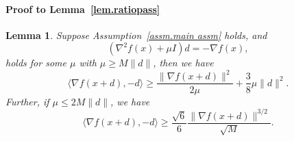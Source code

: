 \documentclass{article}
\theoremstyle{plain}
\newtheorem{lemma}[theorem]{Lemma}
\theoremstyle{definition}
\theoremstyle{remark}
\begin{document}
\paragraph{Proof to Lemma~\ref{lem.ratiopass}}
\begin{lemma}
    \label{lem.inner product g and d appendix}
    Suppose Assumption~\ref{assm.main assm} holds, and
    \begin{equation}
        \label{eq.second-order update appendix}
        \left (\nabla^2 f(x) + \mu I \right )d = -\nabla f(x),
    \end{equation}
    holds for some $\mu$ with $\mu\geq M \|d\|$, then we have
    \begin{equation}
        \label{eq.inner product g d appendix}
        \langle \nabla f(x+d),-d \rangle \geq \frac{\|\nabla f(x+d)\|^2}{2\mu}+\frac{3}{8}\mu \|d\|^2.
    \end{equation}
    Further, if $\mu \leq 2M\|d\|$, we have
    \begin{equation}
        \label{eq.inner product g d advanced appendix}
        \langle \nabla f(x+d),-d \rangle \geq \frac{\sqrt{6}}{6} \frac{\|\nabla f(x+d)\|^{3/2}}{\sqrt{M}}.
    \end{equation}
\end{lemma}
\end{document}
